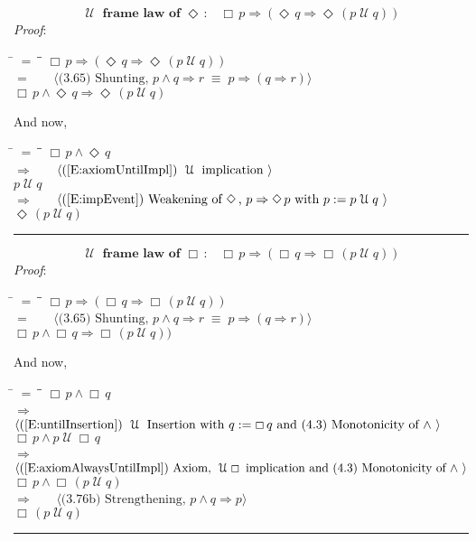 \documentclass[12pt, fleqn, leqno]{article}
\newcommand{\lgap}{2pt}                             %
\newcommand{\mymathindent}{24pt}                    %
\newcommand{\equivs}{\ensuremath{\;\equiv\;}}       %
\newcommand{\impl}{\ensuremath{\Rightarrow}}        %
\newcommand{\Until}{\;\mathcal{U}\;}
\newcommand{\Event}{\Diamond\,}
\newcommand{\Always}{\Box\,}
\newcommand{\myqed}{\rule[-.23ex]{1.2ex}{2.0ex}}
\newcommand{\myqedtab}{\hspace{384pt}}              %
\newcommand{\Gll} {\langle}                         %
\newcommand{\Ggg} {\rangle}                         %
\newcommand{\Hint}[1]     {\ \ \ $\Gll              \mbox{#1} \Ggg$ }   %
\begin{document}
\begin{equation}\label{E:untilframelawEvent}
\textbf{$\Until$ frame law of $\Event$:}\quad \Always p \impl (\Event q \impl \Event (p \Until q))
\end{equation}
\emph{Proof}:
\begin{tabbing}
\hspace{\mymathindent} \= $= \;$ \= \myqedtab \= \kill
  \> \>   $\Always p \impl (\Event q \impl \Event (p \Until q))$\\[\lgap]
  \> $=$  \>  \Hint{(3.65) Shunting, $p\land q\impl r\equivs p\impl (q\impl r)$}\\[\lgap]
  \> \>   $\Always p \land \Event q \impl \Event (p \Until q)$
\end{tabbing}
And now,
\begin{tabbing}
\hspace{\mymathindent} \= $= \;$ \= \myqedtab \= \kill
  \> \>   $\Always p \land \Event q $\\[\lgap]
   \> $\impl$ \> \Hint{(\ref{E:axiomUntilImpl}) $\Until$ implication } \\[\lgap]
   \> \>   $p \Until q $\\[\lgap]
  \> $\impl$  \>  \Hint{(\ref{E:impEvent}) Weakening of $\Event$, $p \impl \Event p$ with $p := p \Until q$ }\\[\lgap]
  \> \>   $\Event (p \Until q) $\quad \myqed
\end{tabbing}

\begin{equation}\label{E:untilframelawAlways}
\textbf{$\Until$ frame law of $\Always$:}\quad \Always p \impl (\Always q \impl \Always (p \Until q))
\end{equation}
\emph{Proof}:
\begin{tabbing}
\hspace{\mymathindent} \= $= \;$ \= \myqedtab \= \kill
  \> \>   $\Always p \impl (\Always q \impl \Always (p \Until q))$\\[\lgap]
  \> $=$  \>  \Hint{(3.65) Shunting, $p\land q\impl r\equivs p\impl (q\impl r)$}\\[\lgap]
  \> \>   $\Always p \land \Always q \impl \Always (p \Until q))$
\end{tabbing}
And now,
\begin{tabbing}
\hspace{\mymathindent} \= $= \;$ \= \myqedtab \= \kill
  \> \>   $\Always p \land \Always q $\\[\lgap]
  \> $\impl$ \> \Hint{(\ref{E:untilInsertion}) $\Until$ Insertion with $q:=\Always q$ and (4.3) Monotonicity of $\land$ } \\[\lgap]
  \> \>   $\Always p \land p \Until \Always q $\\[\lgap]
   \> $\impl$ \> \Hint{(\ref{E:axiomAlwaysUntilImpl}) Axiom, $\Until\Always$ implication and (4.3) Monotonicity of $\land$  } \\[\lgap]
   \> \>   $\Always p \land \Always (p \Until  q) $\\[\lgap]
  \> $\impl$ \> \Hint{(3.76b) Strengthening, $p\land q \impl p$} \\[\lgap]
  \> \>   $\Always (p \Until q) $\quad \myqed
\end{tabbing}
\end{document}
